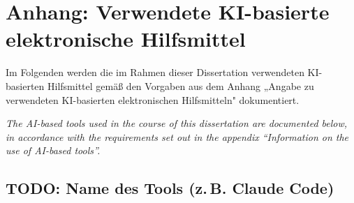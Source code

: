 \chapter*{Anhang: Verwendete KI-basierte elektronische Hilfsmittel}

Im Folgenden werden die im Rahmen dieser Dissertation verwendeten KI-basierten
Hilfsmittel gemäß den Vorgaben aus dem Anhang „Angabe zu verwendeten KI-basierten
elektronischen Hilfsmitteln" dokumentiert.

\emph{\small\color{dkfzgray2} The AI-based tools used in the course of this
dissertation are documented below, in accordance with the requirements set out
in the appendix ``Information on the use of AI-based tools''.}

\bigskip

%
%

\section*{TODO: Name des Tools (z.\,B. Claude Code)}

